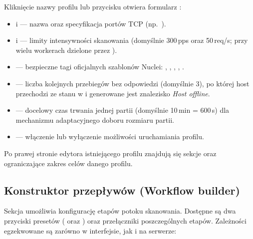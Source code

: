 \documentclass[10pt,a4paper]{article}
\begin{document}
Kliknięcie nazwy profilu lub przycisku  otwiera formularz :
\begin{itemize}
  \item {} i  --- nazwa oraz specyfikacja portów TCP (np.~).
  \item {} i  --- limity intensywności skanowania (domyślnie 300\,pps oraz 50\,req/s; przy wielu workerach dzielone przez ).
  \item {} --- bezpieczne tagi oficjalnych szablonów Nuclei: , , , , .
  \item {} --- liczba kolejnych przebiegów bez odpowiedzi (domyślnie 3), po której host przechodzi ze stanu  w  i generowane jest znalezisko \emph{Host offline}.
  \item {} --- docelowy czas trwania jednej partii (domyślnie 10\,min = 600\,s) dla mechanizmu adaptacyjnego doboru rozmiaru partii.
  \item {} --- włączenie lub wyłączenie możliwości uruchamiania profilu.
\end{itemize}

Po prawej stronie edytora istniejącego profilu znajdują się sekcje  oraz  ograniczające zakres celów danego profilu.

\subsection{Konstruktor przepływów (Workflow builder)}

Sekcja  umożliwia konfigurację etapów potoku skanowania. Dostępne są dwa przyciski presetów ( oraz ) oraz przełączniki poszczególnych etapów. Zależności egzekwowane są zarówno w interfejsie, jak i na serwerze:
\end{document}
